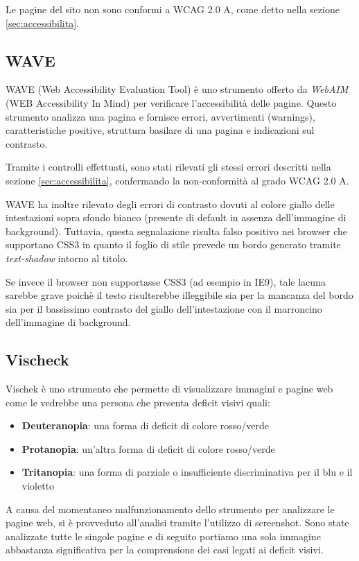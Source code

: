 Le pagine del sito non sono conformi a WCAG 2.0 A, come detto nella sezione
\ref{sec:accessibilita}.

\subsection{WAVE} %
WAVE (Web Accessibility Evaluation Tool) è uno strumento offerto da
\textit{WebAIM} (WEB Accessibility In Mind) per verificare l'accessibilità
delle pagine. Questo strumento analizza una pagina e fornisce errori,
avvertimenti (warnings), caratteristiche positive, struttura basilare di una
pagina e indicazioni sul contrasto.

Tramite i controlli effettuati, sono stati rilevati gli stessi errori
descritti nella sezione \ref{sec:accessibilita}, confermando la non-conformità
al grado WCAG 2.0 A.

WAVE ha inoltre rilevato degli errori di contrasto dovuti al colore giallo
delle intestazioni sopra sfondo bianco (presente di default in assenza
dell'immagine di background). Tuttavia, questa segnalazione risulta falso
positivo nei browser che supportano CSS3 in quanto il foglio di stile prevede
un bordo generato tramite \textit{text-shadow} intorno al titolo.

Se invece il browser non supportasse CSS3 (ad esempio in IE9), tale lacuna
sarebbe grave poichè il testo risulterebbe illeggibile sia per la mancanza del
bordo sia per il bassissimo contrasto del giallo dell'intestazione con il
marroncino dell'immagine di background.

\subsection{Vischeck} %
Vischek è uno strumento che permette di visualizzare immagini e pagine web
come le vedrebbe una persona che presenta deficit visivi quali:
\begin{itemize}
\item \textbf{Deuteranopia}: una forma di deficit di colore rosso/verde
\item \textbf{Protanopia}: un'altra forma di deficit di colore rosso/verde
\item \textbf{Tritanopia}: una forma di parziale o insufficiente
discriminativa per il blu e il violetto
\end{itemize}
A causa del momentaneo malfunzionamento dello strumento per analizzare le
pagine web, si è provveduto all'analisi tramite l'utilizzo di screenshot. Sono
state analizzate tutte le singole pagine e di seguito portiamo una sola
immagine abbastanza significativa per la comprensione dei casi legati ai
deficit visivi.

